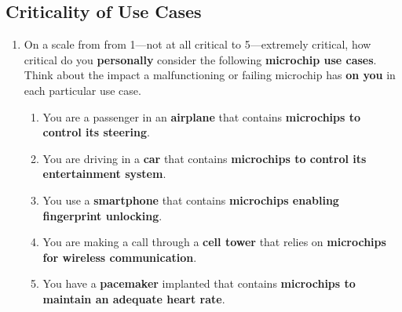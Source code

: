 \subsection{Criticality of Use Cases}
\label{xhw_study::subapp::criticality}
\begin{enumerate}
    \setcounter{enumi}{\value{qcounter}}
    \item \label{xhw_study::question::criticality}
        On a scale from from 1---not at all critical to 5---extremely critical, how critical do you \textbf{personally} consider the following \textbf{microchip use cases}. Think about the impact a malfunctioning or failing microchip has \textbf{on you} in each particular use case.
        \begin{enumerate}
            \item \label{xhw_study::question::criticality_airplane}
                You are a passenger in an \textbf{airplane} that contains \textbf{microchips to control its steering}.
            \item \label{xhw_study::question::criticality_car}
                You are driving in a \textbf{car} that contains \textbf{microchips to control its entertainment system}.
            \item \label{xhw_study::question::criticality_smartphone}
                You use a \textbf{smartphone} that contains \textbf{microchips enabling fingerprint unlocking}.
            \item \label{xhw_study::question::criticality_celltower}
                You are making a call through a \textbf{cell tower} that relies on \textbf{microchips for wireless communication}.
            \item \label{xhw_study::question::criticality_pacemaker}
                You have a \textbf{pacemaker} implanted that contains \textbf{microchips to maintain an adequate heart rate}.
        \end{enumerate}
    \setcounter{qcounter}{\value{enumi}}
\end{enumerate}

